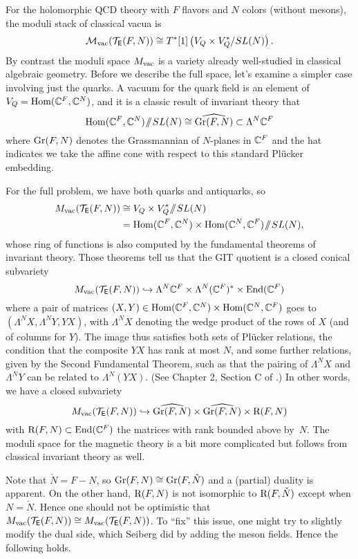 \documentclass[11pt]{amsart}
\begin{document}
For the holomorphic QCD theory with $F$ flavors and $N$ colors (without mesons), 
the moduli stack of classical vacua is 
\[
\mathcal M_{\rm vac}(\mathcal T_{\mathsf E}(F,N)) \cong T^*[1] \left(V_Q \times V_Q^*/SL(N)\right).
\]
By contrast the moduli space $M_{\rm vac}$ is a variety already well-studied in classical algebraic geometry.
Before we describe the full space, let's examine a simpler case involving just the quarks.
A vacuum for the quark field is an element of $V_Q = {\rm Hom}(\mathbb C^F, \mathbb C^N)$,
and it is a classic result of invariant theory that
\[
{\rm Hom}(\mathbb C^F, \mathbb C^N)\!\sslash\! SL(N) \cong \widehat{{\rm Gr}(F, N)} \subset \Lambda^N \mathbb C^F
\]
where ${\rm Gr}(F, N)$ denotes the Grassmannian of $N$-planes in $\mathbb C^F$ and the hat indicates we take the affine cone with respect to this standard Pl\"ucker embedding.

For the full problem, we have both quarks and antiquarks, so
\begin{align*}
M_{\rm vac}(\mathcal T_{\mathsf E}(F,N)) 
&\cong V_Q \times V_Q^*\!\sslash\! SL(N) \\
&= {\rm Hom}(\mathbb C^F, \mathbb C^N) \times {\rm Hom}(\mathbb C^N, \mathbb C^F)\!\sslash\! SL(N),
\end{align*}
whose ring of functions is also computed by the fundamental theorems of invariant theory.
Those theorems tell us that the GIT quotient is a closed conical subvariety
\[
M_{\rm vac}(\mathcal T_{\mathsf E}(F,N))  \hookrightarrow \Lambda^N \mathbb C^F \times \Lambda^N (\mathbb C^F)^* \times {\rm End}(\mathbb C^F)
\]
where a pair of matrices $(X,Y) \in {\rm Hom}(\mathbb C^F, \mathbb C^N) \times {\rm Hom}(\mathbb C^N, \mathbb C^F)$ goes to $(\Lambda^N X, \Lambda^N Y, YX)$, with $\Lambda^N X$ denoting the wedge product of the rows of $X$ (and of columns for $Y$).
The image thus satisfies both sets of Pl\"ucker relations, the condition that the composite $YX$ has rank at most $N$, and some further relations, given by the Second Fundamental Theorem, such as that the pairing of $\Lambda^N X$ and $\Lambda^N Y$ can be related to $\Lambda^N (YX)$.
(See Chapter 2, Section C of \cite{Weyl}.)
In other words, we have a closed subvariety
\[
M_{\rm vac}(\mathcal T_{\mathsf E}(F,N)) \hookrightarrow \widehat{{\rm Gr}(F, N)} \times \widehat{{\rm Gr}(F, N)} \times {\rm R}(F,N)
\]
with ${\rm R}(F,N) \subset {\rm End}(\mathbb C^F)$ the matrices with rank bounded above by~$N$.
The moduli space for the magnetic theory is a bit more complicated but follows from classical invariant theory as well.

Note that $\check{N} = F-N$, so ${\rm Gr}(F, N) \cong {\rm Gr}(F, \check{N})$ and a (partial) duality is apparent.
On the other hand, ${\rm R}(F,N)$ is not isomorphic to ${\rm R}(F,\check{N})$ except when $N = \check{N}$.
Hence one should not be optimistic that $M_{\rm vac}(\mathcal T_{\mathsf E}(F,N)) \cong M_{\rm vac}(\mathcal T_{\mathsf E}(F,N))$.
To ``fix'' this issue, one might try to slightly modify the dual side, which Seiberg did by adding the meson fields.
Hence the following holds.
\end{document}
